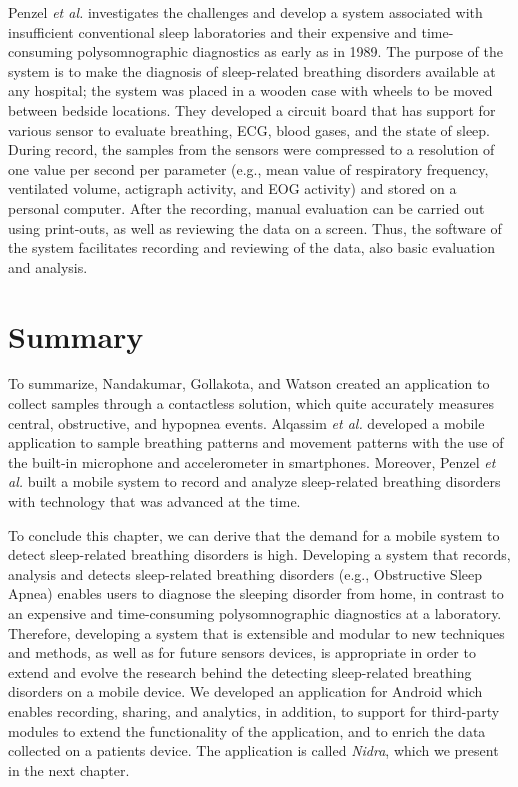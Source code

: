 Penzel \textit{et al.} \cite{mobilesleeplab} investigates the challenges and develop a system associated with insufficient conventional sleep laboratories and their expensive and time-consuming polysomnographic diagnostics as early as in 1989. The purpose of the system is to make the diagnosis of sleep-related breathing disorders available at any hospital; the system was placed in a wooden case with wheels to be moved between bedside locations. They developed a circuit board that has support for various sensor to evaluate breathing, ECG, blood gases, and the state of sleep. During record, the samples from the sensors were compressed to a resolution of one value per second per parameter (e.g., mean value of respiratory frequency, ventilated volume, actigraph activity, and EOG activity) and stored on a personal computer. After the recording, manual evaluation can be carried out using print-outs, as well as reviewing the data on a screen. Thus, the software of the system facilitates recording and reviewing of the data, also basic evaluation and analysis. 

\section{Summary}

To summarize, Nandakumar, Gollakota, and Watson created an application to collect samples through a contactless solution, which quite accurately measures central, obstructive, and hypopnea events. Alqassim \textit{et al.} developed a mobile application to sample breathing patterns and movement patterns with the use of the built-in microphone and accelerometer in smartphones. Moreover, Penzel \textit{et al.} built a mobile system to record and analyze sleep-related breathing disorders with technology that was advanced at the time.

To conclude this chapter, we can derive that the demand for a mobile system to detect sleep-related breathing disorders is high. Developing a system that records, analysis and detects sleep-related breathing disorders (e.g., Obstructive Sleep Apnea) enables users to diagnose the sleeping disorder from home, in contrast to an expensive and time-consuming polysomnographic diagnostics at a laboratory. Therefore, developing a system that is extensible and modular to new techniques and methods, as well as for future sensors devices, is appropriate in order to extend and evolve the research behind the detecting sleep-related breathing disorders on a mobile device. We developed an application for Android which enables recording, sharing, and analytics, in addition, to support for third-party modules to extend the functionality of the application, and to enrich the data collected on a patients device. The application is called \textit{Nidra}, which we present in the next chapter. 
